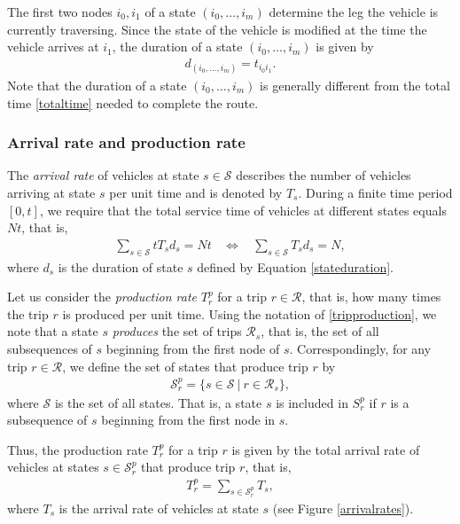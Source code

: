 \documentclass[dissertation,draft*]{aaltoseries}
\begin{document}
The first two nodes $i_0,i_1$ of a state $(i_0,\ldots,i_m)$ determine the leg the vehicle is currently traversing.
Since the state of the vehicle is modified at the time the vehicle arrives at $i_1$, 
the duration of a state $(i_0,\ldots,i_m)$ is given by 
\begin{align}
\label{stateduration}
d_{(i_0,\ldots, i_m)} = t_{i_0i_1}. 
\end{align}
Note that the duration of a state $(i_0,\ldots, i_m)$ is generally different from the total
time \eqref{totaltime} needed to complete the route.

\subsubsection{Arrival rate and production rate}
The \emph{arrival rate} of vehicles at state $s \in \mathcal{S}$ describes the 
number of vehicles arriving at state $s$ per unit time and is denoted by $T_s$.
During a finite time period $[0,t]$, we require that the total service time of vehicles 
at different states equals $Nt$, that is,
\begin{align}
\label{rajoitus01}
\sum_{s \in \mathcal{S}} t T_s d_s = Nt \ \ \ \ 
\Leftrightarrow \ \ \ \ \sum_{s \in \mathcal{S}} T_s d_s = N,
\end{align}
where $d_s$ is the duration of state $s$ defined by Equation \eqref{stateduration}.

Let us consider the \emph{production rate} $T_{r}^p$ for a trip $r \in \mathcal{R}$,
that is, how many times the trip $r$ is produced per unit time.
Using the notation of \eqref{tripproduction}, we note that a state $s$ \emph{produces}
the set of trips $\mathcal{R}_s$, that is, the set of all subsequences of $s$
beginning from the first node of $s$.
Correspondingly, for any trip $r \in \mathcal{R}$, %
we define the set of states that produce trip $r$ by 
\begin{align*}
\mathcal{S}_{r}^p = \{ s \in \mathcal{S} \ | \ r \in \mathcal{R}_s \}, 
\end{align*}
where $\mathcal{S}$ is the set of all states. That is, a state $s$ is included in $S_r^p$
if $r$ is a subsequence of $s$ beginning from the first node in $s$.

Thus, the production rate $T_{r}^p$ for a trip $r$
is given by the total arrival rate of vehicles at states $s \in \mathcal{S}_{r}^p$ that 
produce trip $r$, that is,
\begin{align}
\label{totalrate}
T_{r}^p = \sum_{s \in \mathcal{S}_{r}^p} T_s,
\end{align}
where $T_s$ is the arrival rate of vehicles at state $s$ (see Figure \ref{arrivalrates}).
\end{document}
